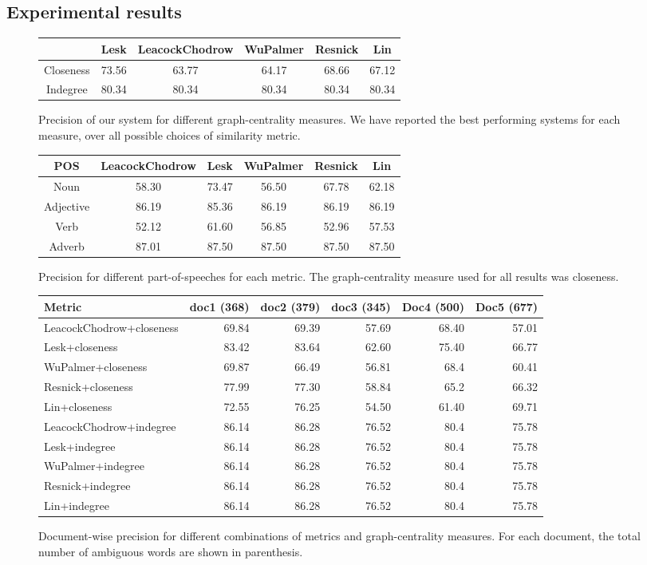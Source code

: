 \documentclass[12pt,letterpaper]{article}
\begin{document}
\subsection{Experimental results}
\label{sec:experimental-results}
\begin{figure}
\centering
\begin{minipage}{.5\linewidth}
\begin{tabular}{|c|c|c|c|c|c|}
  & Lesk & LeacockChodrow & WuPalmer & Resnick & Lin  \\
\hline
Closeness & 73.56 & 63.77 & 64.17 & 68.66 & 67.12\\
Indegree & 80.34 & 80.34 & 80.34 & 80.34 & 80.34 \\
\end{tabular}
\caption{Precision of our system for different graph-centrality measures. We have reported the best performing systems for each measure, over all possible choices of similarity metric.}
\end{minipage}
\quad
\begin{tabular}{|c|c|c|c|c|c|}
POS & LeacockChodrow & Lesk & WuPalmer & Resnick & Lin  \\
\hline
Noun & 58.30 & 73.47 & 56.50& 67.78 & 62.18\\
Adjective & 86.19 & 85.36 & 86.19 & 86.19 & 86.19\\
Verb & 52.12 & 61.60 & 56.85 & 52.96 & 57.53\\
Adverb & 87.01 & 87.50 & 87.50 & 87.50 & 87.50\\
\end{tabular}
\caption{Precision for different part-of-speeches for each metric. The graph-centrality measure used for all results was closeness.}
\end{figure}
\begin{figure}
\begin{tabular}{|l|r|r|r|r|r|}
Metric & doc1 (368) & doc2 (379) & doc3 (345) & Doc4 (500) & Doc5 (677) \\
\hline
LeacockChodrow+closeness & 69.84 & 69.39 & 57.69 & 68.40 & 57.01 \\
Lesk+closeness & 83.42 & 83.64 & 62.60 & 75.40 & 66.77 \\
WuPalmer+closeness & 69.87 & 66.49 & 56.81 & 68.4 & 60.41 \\
Resnick+closeness & 77.99 & 77.30 & 58.84 & 65.2 & 66.32 \\
Lin+closeness & 72.55 & 76.25 & 54.50 & 61.40 & 69.71 \\
LeacockChodrow+indegree & 86.14 & 86.28 & 76.52 & 80.4 & 75.78 \\
Lesk+indegree & 86.14 & 86.28 & 76.52 & 80.4 & 75.78 \\
WuPalmer+indegree & 86.14 & 86.28 & 76.52 & 80.4 & 75.78 \\
Resnick+indegree & 86.14 & 86.28 & 76.52 & 80.4 & 75.78 \\
Lin+indegree & 86.14 & 86.28 & 76.52 & 80.4 & 75.78 \\
\end{tabular}
\caption{Document-wise precision for different combinations of metrics and graph-centrality measures. For each document, the total number of ambiguous words are shown in parenthesis.}
\end{figure}
\end{document}
